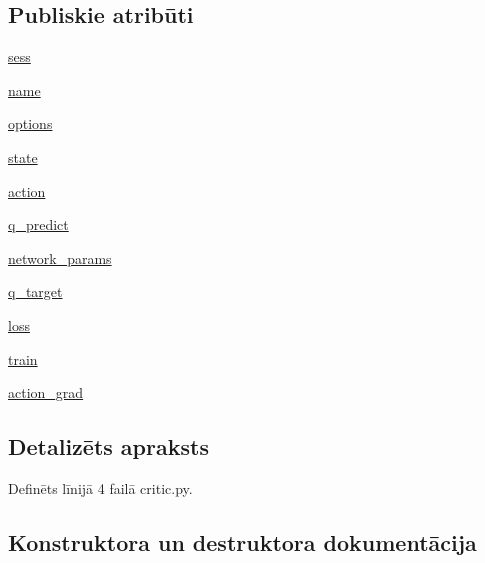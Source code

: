 \subsection*{Publiskie atribūti}
\begin{DoxyCompactItemize}
\item 
\hyperlink{classcritic_1_1_critic_network_ad19c4eb9fce11599a0807f94fcab6343}{sess}
\item 
\hyperlink{classcritic_1_1_critic_network_ad7a59dc914d7e6eff3d96c6c819bef38}{name}
\item 
\hyperlink{classcritic_1_1_critic_network_a14fa3b43d18dc2e8e5ca3fcd617b8bcc}{options}
\item 
\hyperlink{classcritic_1_1_critic_network_a21da613cb1688ada3b416e4286649fc2}{state}
\item 
\hyperlink{classcritic_1_1_critic_network_a78b46c2dc517101434ffc7053581f5a6}{action}
\item 
\hyperlink{classcritic_1_1_critic_network_a5c8a5c7b27312a19cd603216db6e5b52}{q\+\_\+predict}
\item 
\hyperlink{classcritic_1_1_critic_network_a033abaa32fa20baf9d2faaa6a2c6fae3}{network\+\_\+params}
\item 
\hyperlink{classcritic_1_1_critic_network_acae4004c3e447aaadc7f25ee2a550f60}{q\+\_\+target}
\item 
\hyperlink{classcritic_1_1_critic_network_a720bbce2d663aea7f91ad957a0d24542}{loss}
\item 
\hyperlink{classcritic_1_1_critic_network_a85b9d34191b5218ce6af960ec3846b4f}{train}
\item 
\hyperlink{classcritic_1_1_critic_network_aeec8c7f1d08044b18a6c85868a18174a}{action\+\_\+grad}
\end{DoxyCompactItemize}


\subsection{Detalizēts apraksts}


Definēts līnijā 4 failā critic.\+py.



\subsection{Konstruktora un destruktora dokumentācija}
